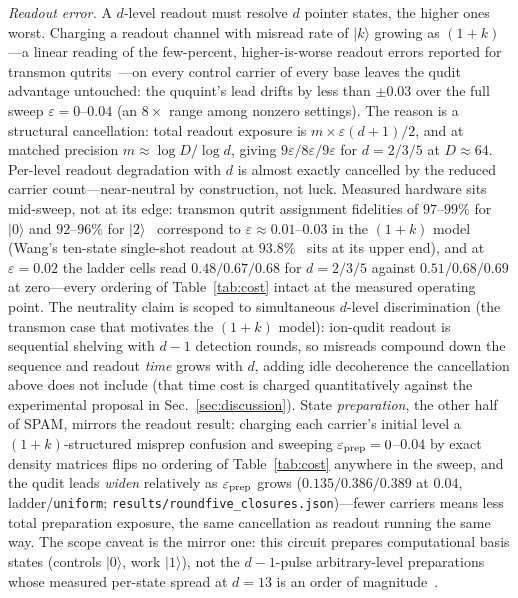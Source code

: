 \documentclass[aps,pra,reprint,superscriptaddress,nofootinbib,floatfix]{revtex4-2}
\begin{document}
\emph{Readout error.} A $d$-level readout must resolve $d$ pointer
states, the higher ones worst. Charging a readout channel with misread
rate of $\lvert k\rangle$ growing as $(1+k)$---a linear reading of the
few-percent, higher-is-worse readout errors reported for transmon
qutrits~\cite{blok2021,goss2024}---on every control carrier of every
base leaves the qudit advantage untouched: the ququint's lead drifts
by less than $\pm0.03$ over the full sweep $\varepsilon=0$--$0.04$ (an
$8\times$ range among nonzero settings). The reason is a structural cancellation: total readout
exposure is $m\times\varepsilon(d{+}1)/2$, and at matched precision
$m\approx\log D/\log d$, giving $9\varepsilon/8\varepsilon/9\varepsilon$
for $d=2/3/5$ at $D\approx64$. Per-level readout degradation with $d$ is
almost exactly cancelled by the reduced carrier count---near-neutral by
construction, not luck. Measured hardware sits mid-sweep, not at its
edge: transmon qutrit assignment fidelities of $97$--$99\%$ for
$\lvert0\rangle$ and $92$--$96\%$ for
$\lvert2\rangle$~\cite{blok2021,goss2024} correspond to
$\varepsilon\approx0.01$--$0.03$ in the $(1{+}k)$ model (Wang's
ten-state single-shot readout at $93.8\%$~\cite{wang2025} sits at its
upper end), and at $\varepsilon=0.02$ the ladder cells read
$0.48/0.67/0.68$ for $d=2/3/5$ against $0.51/0.68/0.69$ at
zero---every ordering of Table~\ref{tab:cost} intact at the measured
operating point. The neutrality claim is scoped to
simultaneous $d$-level discrimination (the transmon case that
motivates the $(1{+}k)$ model): ion-qudit readout is sequential
shelving with $d-1$ detection rounds, so misreads compound down the
sequence and readout \emph{time} grows with $d$, adding idle
decoherence the cancellation above does not include (that time cost
is charged quantitatively against the experimental proposal in
Sec.~\ref{sec:discussion}). State \emph{preparation}, the other half
of SPAM, mirrors the readout result: charging each carrier's
initial level a $(1{+}k)$-structured misprep confusion and
sweeping $\varepsilon_{\rm prep}=0$--$0.04$ by exact density
matrices flips no ordering of Table~\ref{tab:cost} anywhere in the
sweep, and the qudit leads \emph{widen} relatively as
$\varepsilon_{\rm prep}$ grows ($0.135/0.386/0.389$ at $0.04$,
ladder/\texttt{uniform};
\texttt{results/roundfive\_closures.json})---fewer carriers means
less total preparation exposure, the same cancellation as readout
running the same way. The scope caveat is the mirror one:
this circuit prepares computational basis states (controls
$\lvert0\rangle$, work $\lvert1\rangle$), not the
$d-1$-pulse arbitrary-level preparations whose measured per-state
spread at $d=13$ is an order of magnitude~\cite{low2023}.
\end{document}
